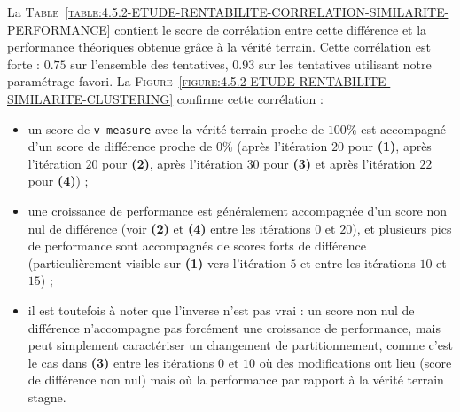 			La \textsc{Table~\ref{table:4.5.2-ETUDE-RENTABILITE-CORRELATION-SIMILARITE-PERFORMANCE}} contient le score de corrélation entre cette différence et la performance théoriques obtenue grâce à la vérité terrain.
			Cette corrélation est forte : $0.75$ sur l'ensemble des tentatives, $0.93$ sur les tentatives utilisant notre paramétrage favori.
			La \textsc{Figure~\ref{figure:4.5.2-ETUDE-RENTABILITE-SIMILARITE-CLUSTERING}} confirme cette corrélation :
			\begin{itemize}
				\item un score de \texttt{v-measure} avec la vérité terrain proche de $100$\% est accompagné d'un score de différence proche de $0$\% (après l'itération $20$ pour \textbf{(1)}, après l'itération $20$ pour \textbf{(2)}, après l'itération $30$ pour \textbf{(3)} et après l'itération $22$ pour \textbf{(4)}) ;
				\item une croissance de performance est généralement accompagnée d'un score non nul de différence (voir \textbf{(2)} et \textbf{(4)} entre les itérations $0$ et $20$), et plusieurs pics de performance sont accompagnés de scores forts de différence (particulièrement visible sur \textbf{(1)} vers l'itération $5$ et entre les itérations $10$ et $15$) ;
				\item il est toutefois à noter que l'inverse n'est pas vrai : un score non nul de différence n'accompagne pas forcément une croissance de performance, mais peut simplement caractériser un changement de partitionnement, comme c'est le cas dans \textbf{(3)} entre les itérations $0$ et $10$ où des modifications ont lieu (score de différence non nul) mais où la performance par rapport à la vérité terrain stagne.
			\end{itemize}
